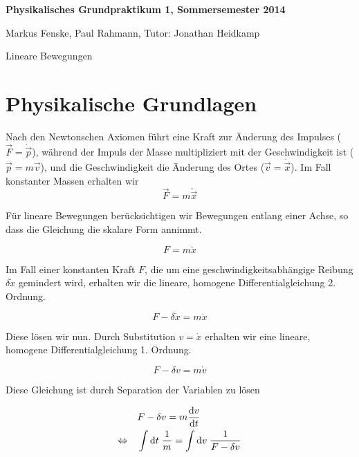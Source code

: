 \documentclass[a4paper,german,12pt,smallheadings]{scrartcl}
\begin{document}
\allowdisplaybreaks %
\begin{center}
\bfseries %
\sffamily %
\vspace{-40pt}
Physikalisches Grundpraktikum 1, Sommersemester 2014

Markus Fenske, Paul Rahmann, Tutor: Jonathan Heidkamp

Lineare Bewegungen
\vspace{-10pt}
\end{center}

\section*{Physikalische Grundlagen}

Nach den Newtonschen Axiomen führt eine Kraft zur Änderung des Impulses
($\vec{F} = \dot{\vec{p}}$), während der Impuls der Masse multipliziert mit der
Geschwindigkeit ist ($\vec{p} = m \vec{v}$), und die Geschwindigkeit die
Änderung des Ortes ($\vec{v} = \dot{\vec{x}}$). Im Fall konstanter Massen erhalten wir
\begin{equation}
  \vec{F} = m \ddot{\vec{x}}
\end{equation}

Für lineare Bewegungen berücksichtigen wir Bewegungen entlang einer Achse, so
dass die Gleichung die skalare Form annimmt.

\begin{equation}
  F = m \ddot{x}
\end{equation}

Im Fall einer konstanten Kraft $F$, die um eine geschwindigkeitsabhängige
Reibung $\delta \dot{x}$ gemindert wird, erhalten wir die lineare, homogene
Differentialgleichung 2. Ordnung.

\begin{equation}
  F - \delta \dot{x} = m \ddot{x}
\end{equation}

Diese lösen wir nun. Durch Substitution $v = \dot{x}$ erhalten wir eine
lineare, homogene Differentialgleichung 1. Ordnung.

\begin{equation}
  F - \delta v = m \dot{v}
\end{equation}

Diese Gleichung ist durch Separation der Variablen zu lösen

\begin{align}
  &F - \delta v = m \frac{\dif v}{\dif t} \\
  \Leftrightarrow\quad
  &\int \dif t \; \frac{1}{m} = \int \dif v \; \frac{1}{F - \delta v} \\
\end{align}
\end{document}

